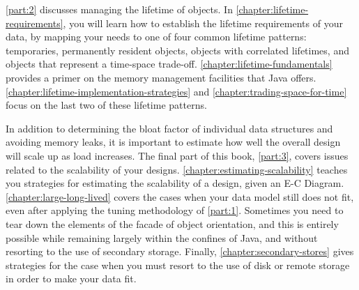 
\begin{comment}
[NMM 20120628 too much E-C diagram detail for intro?]
A data model implementation begins with a conceptual understanding of the
entities and relationships in the model.  This may be an informal understanding,
or it may be formalized in a diagram such as an E-R diagram or a UML class
diagram.  At some point that conceptual model is turned into Java classes that
represent the entities, attributes, and assocations of the model, as well as any
auxiliary structures, such as indexes, needed to access the data.  The example
below shows a simple conceptual model, using a UML class diagram.  A Java
implementation of that model is also shown, using rectangles for classes and
arrows for references.  %
in that it shows
\end{comment}


\autoref{part:2} discusses managing the lifetime of objects. In
\autoref{chapter:lifetime-requirements}, you will learn how to establish the
lifetime requirements of your data, by mapping your needs to one of four common
lifetime patterns: temporaries, permanently resident objects, objects with
correlated lifetimes, and objects that represent a time-space trade-off.
\autoref{chapter:lifetime-fundamentals} provides a primer on the memory
management facilities that Java offers.
\autoref{chapter:lifetime-implementation-strategies} and
\autoref{chapter:trading-space-for-time} focus on the last two of these lifetime
patterns.


In addition to determining the bloat factor of individual data structures and
avoiding memory leaks, it is important to estimate how well the overall design
will scale up as load increases. The final part of this book, \autoref{part:3},
covers issues related to the scalability of your designs.
\autoref{chapter:estimating-scalability} teaches you strategies for estimating
the scalability of a design, given an E-C Diagram.
\autoref{chapter:large-long-lived} covers the cases when your data model still
does not fit, even after applying the tuning methodology of \autoref{part:1}.
Sometimes you need to tear down the elements of the facade of object
orientation, and this is entirely possible while remaining largely within the
confines of Java, and without resorting to the use of secondary storage.
Finally, \autoref{chapter:secondary-stores} gives strategies for the case when
you must resort to the use of disk or remote storage in order to make your data
fit.




